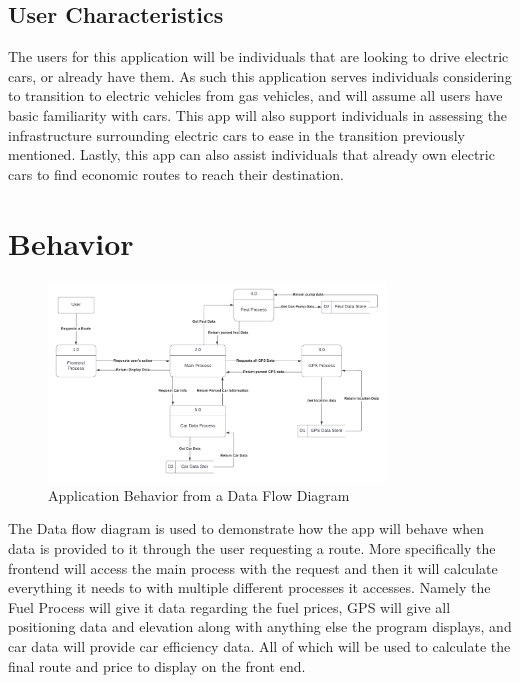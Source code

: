 \documentclass[12pt]{article}
\begin{document}
\subsection{User Characteristics} \label{SecUserCharacteristics}

The users for this application will be individuals that are looking to drive electric 
cars, or already have them. As such this application serves individuals considering to 
transition to electric vehicles from gas vehicles, and will assume all users have basic 
familiarity with cars. This app will also support individuals in assessing the infrastructure 
surrounding electric cars to ease in the transition previously mentioned. Lastly, this app 
can also assist individuals that already own electric cars to find economic routes to reach 
their destination.

\newpage
\section{Behavior}

\begin{figure}[h!]
  \begin{center}
   \includegraphics[width=0.8\textwidth]{DataFlowDiagram.png}
  \caption{Application Behavior from a Data Flow Diagram}
  \label{Fig_DataFlow} 
  \end{center}
\end{figure}

The Data flow diagram is used to demonstrate how the app will behave when data is provided to it through the user requesting a route. More specifically the frontend will access the main process with the request and then it will calculate everything it needs to with multiple different processes it accesses. Namely the Fuel Process will give it data regarding the fuel prices, GPS will give all positioning data and elevation along with anything else the program displays, and car data will provide car efficiency data. All of which will be used to calculate the final route and price to display on the front end. 
\end{document}
